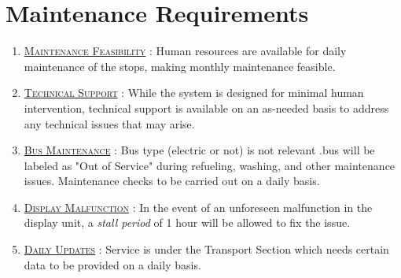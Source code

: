 \section{Maintenance Requirements}

\begin{enumerate}
    \item \underline{\textsc{Maintenance Feasibility}} : Human resources are available for daily maintenance of the stops, making monthly maintenance feasible.

    \item {}\underline{\textsc{Technical Support}} : While the system is designed for minimal human intervention, technical support is available on an as-needed basis to address any technical issues that may arise.

    \item \underline{\textsc{Bus Maintenance}} : Bus type (electric or not) is not relevant .bus will be labeled as "Out of Service" during refueling, washing, and other maintenance issues. Maintenance checks to be carried out on a daily basis.

    \item {}\underline{\textsc{Display Malfunction}} : In the event of an unforeseen malfunction in the display unit, a \textit{\gls{stall period}} of 1 hour will be allowed to fix the issue.

    \item \underline{\textsc{Daily Updates}} : Service is under the Transport Section which needs certain data to be provided on a daily basis.
\end{enumerate}